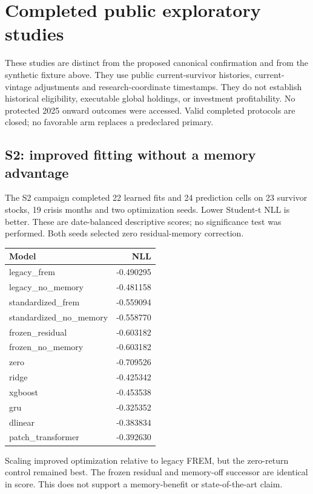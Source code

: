\section{Completed public exploratory studies}
These studies are distinct from the proposed canonical confirmation and from the synthetic fixture above. They use public current-survivor histories, current-vintage adjustments and research-coordinate timestamps. They do not establish historical eligibility, executable global holdings, or investment profitability. No protected 2025 onward outcomes were accessed. Valid completed protocols are closed; no favorable arm replaces a predeclared primary.

\subsection{S2: improved fitting without a memory advantage}
The S2 campaign completed 22 learned fits and 24 prediction cells on 23 survivor stocks, 19 crisis months and two optimization seeds. Lower Student-t NLL is better. These are date-balanced descriptive scores; no significance test was performed. Both seeds selected zero residual-memory correction.
\begin{center}
\begin{tabular}{lr}
\toprule
Model & NLL \\
\midrule
legacy\_frem & -0.490295 \\
legacy\_no\_memory & -0.481158 \\
standardized\_frem & -0.559094 \\
standardized\_no\_memory & -0.558770 \\
frozen\_residual & -0.603182 \\
frozen\_no\_memory & -0.603182 \\
zero & -0.709526 \\
ridge & -0.425342 \\
xgboost & -0.453538 \\
gru & -0.325352 \\
dlinear & -0.383834 \\
patch\_transformer & -0.392630 \\
\bottomrule
\end{tabular}
\end{center}
Scaling improved optimization relative to legacy FREM, but the zero-return control remained best. The frozen residual and memory-off successor are identical in score. This does not support a memory-benefit or state-of-the-art claim.

